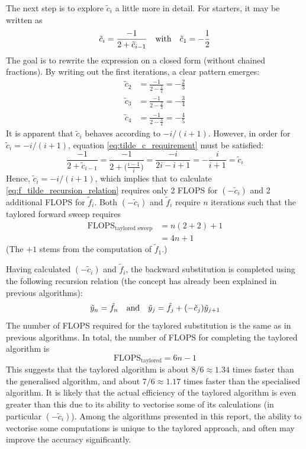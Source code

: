 \documentclass[reprint,english]{revtex4-1}
\begin{document}
The next step is to explore \(\tilde{c}_i\) a little more in detail. For starters, it may be written as
\begin{equation}\label{eq:tilde_c_requirement}
\tilde{c}_i=\frac{-1}{2+\tilde{c}_{i-1}}\qq{with}\tilde{c}_1=-\frac{1}{2}
\end{equation}
The goal is to rewrite the expression on a closed form (without chained fractions). By writing out the first iterations, a clear pattern emerges:
\begin{align*}
\tilde{c}_2&=\frac{-1}{2-\frac{1}{2}}=-\frac{2}{3}\\
\tilde{c}_3&=\frac{-1}{2-\frac{2}{3}}=-\frac{3}{4}\\
\tilde{c}_4&=\frac{-1}{2-\frac{3}{4}}=-\frac{4}{5}
\end{align*}
It is apparent that \(\tilde{c}_i\) behaves according to \(-i/(i+1)\). However, in order for \(\tilde{c}_i=-i/(i+1)\), equation \eqref{eq:tilde_c_requirement} must be satisfied:
\[\frac{-1}{2+\tilde{c}_{i-1}}=\frac{-1}{2+\big(\frac{i-1}{i}\big)}=\frac{-i}{2i-i+1}=-\frac{i}{i+1}=\tilde{c}_i\]
Hence, \(\tilde{c}_i=-i/(i+1)\), which implies that to calculate \eqref{eq:f_tilde_recursion_relation} requires only 2 FLOPS for \((-\tilde{c}_i)\) and 2 additional FLOPS for \(\tilde{f}_i\). Both \((-\tilde{c}_i)\) and \(\tilde{f}_i\) require \(n\) iterations such that the taylored forward sweep requires
\begin{align}
\text{FLOPS}_{\text{taylored sweep}}&=n(2+2)+1\nonumber\\
&=4n+1
\end{align}
(The \(+1\) stems from the computation of \(\tilde{f}_1\).)

Having calculated \((-\tilde{c}_i)\) and \(\tilde{f}_i\), the backward substitution is completed using the following recursion relation (the concept has already been explained in previous algorithms):
\begin{equation}
\tilde{y}_n=\tilde{f}_n\qand\tilde{y}_j=\tilde{f}_j+(-\tilde{c}_j)\tilde{y}_{j+1}
\end{equation}
The number of FLOPS required for the taylored substitution is the same as in previous algorithms. In total, the number of FLOPS for completing the taylored algorithm is
\begin{equation}
\text{FLOPS}_{\text{taylored}}=6n-1
\end{equation}
This suggests that the taylored algorithm is about \(8/6\approx1.34\) times faster than the generalised algorithm, and about \(7/6\approx1.17\) times faster than the specialised algorithm. It is likely that the actual efficiency of the taylored algorithm is even greater than this due to its ability to vectorise some of its calculations (in particular \((-\tilde{c}_i)\)). Among the algorithms presented in this report, the ability to vectorise some computations is unique to the taylored approach, and often may improve the accuracy significantly.
\end{document}
